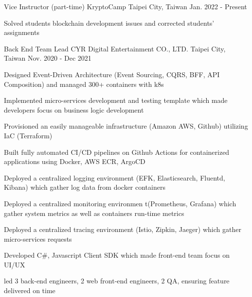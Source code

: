 
\begin{cventries}
  \cventry
    {Vice Instructor (part-time)} %
    {KryptoCamp} %
    {Taipei City, Taiwan} %
    {Jan. 2022 - Present} %
    {
      \begin{cvitems} %
        \item {Solved students blockchain development issues and corrected students' assignments}
      \end{cvitems}
    }

  \cventry
    {Back End Team Lead} %
    {CYR Digital Entertainment CO., LTD.} %
    {Taipei City, Taiwan} %
    {Nov. 2020 - Dec 2021} %
    {
      \begin{cvitems} %
        \item {Designed Event-Driven Architecture (Event Sourcing, CQRS, BFF, API Composition) and managed 300+ containers with k8s}
        \item {Implemented micro-services development and testing template which made developers focus on business logic development}
        \item {Provisioned an easily manageable infrastructure (Amazon AWS, Github) utilizing IaC (Terraform)}
        \item {Built fully automated CI/CD pipelines on Github Actions for containerized applications using Docker, AWS ECR, ArgoCD}
        \item {Deployed a centralized logging environment (EFK, Elasticsearch, Fluentd, Kibana) which gather log data from docker containers}
        \item {Deployed a centralized monitoring environmen t(Prometheus, Grafana) which gather system metrics as well as containers run-time metrics}
        \item {Deployed a centralized tracing environment (Istio, Zipkin, Jaeger) which gather micro-services requests}
        \item {Developed C\#, Javascript Client SDK which made front-end team focus on UI/UX}
        \item {led 3 back-end engineers, 2 web front-end engineers, 2 QA, ensuring feature delivered on time}
      \end{cvitems}
    }
    

\end{cventries}
